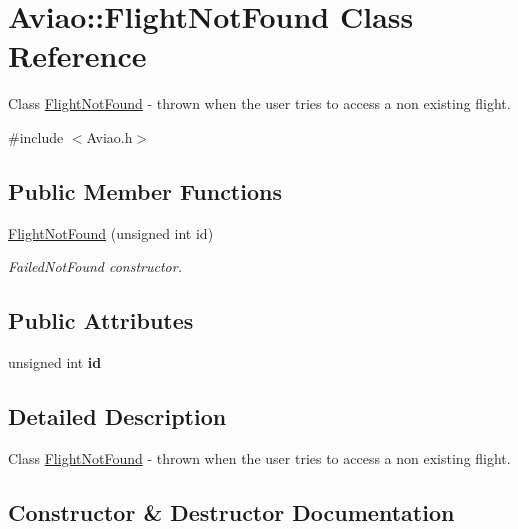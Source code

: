 \hypertarget{class_aviao_1_1_flight_not_found}{}\section{Aviao\+:\+:Flight\+Not\+Found Class Reference}
\label{class_aviao_1_1_flight_not_found}


Class \hyperlink{class_aviao_1_1_flight_not_found}{Flight\+Not\+Found} -\/ thrown when the user tries to access a non existing flight.  




{\ttfamily \#include $<$Aviao.\+h$>$}

\subsection*{Public Member Functions}
\begin{DoxyCompactItemize}
\item 
\hyperlink{class_aviao_1_1_flight_not_found_aa6452e0dd81c36a004c15c4024049e7c}{Flight\+Not\+Found} (unsigned int id)
\begin{DoxyCompactList}\small\item\em Failed\+Not\+Found constructor. \end{DoxyCompactList}\end{DoxyCompactItemize}
\subsection*{Public Attributes}
\begin{DoxyCompactItemize}
\item 
\mbox{\label{class_aviao_1_1_flight_not_found_a49908164e0a86d16f02880fc7fb575b3}} 
unsigned int {\bfseries id}
\end{DoxyCompactItemize}


\subsection{Detailed Description}
Class \hyperlink{class_aviao_1_1_flight_not_found}{Flight\+Not\+Found} -\/ thrown when the user tries to access a non existing flight. 

\subsection{Constructor \& Destructor Documentation}
\mbox{\label{class_aviao_1_1_flight_not_found_aa6452e0dd81c36a004c15c4024049e7c}} 
